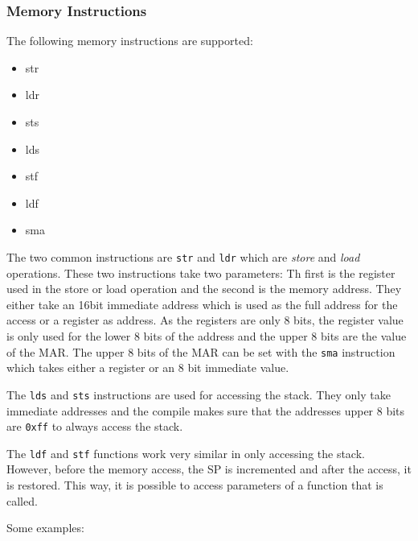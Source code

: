 \subsubsection{Memory Instructions}\label{sec:memInstr}
The following memory instructions are supported:
\begin{multicols}{4}
  \begin{itemize}
    \item str
    \item ldr
    \item sts
    \item lds
    \item stf
    \item ldf
    \item sma
  \end{itemize}
\end{multicols}

The two common instructions are \texttt{str} and \texttt{ldr} which are \emph{store} and \emph{load} operations.
These two instructions take two parameters:
Th first is the register used in the store or load operation and the second is the memory address.
They either take an 16bit immediate address which is used as the full address for the access or a register as address.
As the registers are only 8 bits, the register value is only used for the lower 8 bits of the address and the upper 8 bits are the value of the \gls{MAR}.
The upper 8 bits of the \gls{MAR} can be set with the \texttt{sma} instruction which takes either a register or an 8 bit immediate value.

The \texttt{lds} and \texttt{sts} instructions are used for accessing the stack.
They only take immediate addresses and the compile makes sure that the addresses upper 8 bits are \texttt{0xff} to always access the stack.

The \texttt{ldf} and \texttt{stf} functions work very similar in only accessing the stack.
However, before the memory access, the \gls{SP} is incremented and after the access, it is restored.
This way, it is possible to access parameters of a function that is called.

Some examples:

